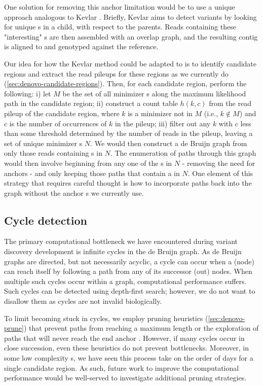 One solution for removing this anchor \kmer{} limitation would be to use a unique \kmer{} approach analogous to Kevlar \cite{Standage2019}. Briefly, Kevlar aims to detect \denovo{} variants by looking for unique \kmer{}s in a child, with respect to the parents. Reads containing these "interesting" \kmer{}s are then assembled with an overlap graph, and the resulting contig is aligned to and genotyped against the reference.

Our idea for how the Kevlar method could be adapted to \pandora{} is to identify candidate regions and extract the read pileups for these regions as we currently do (\autoref{sec:denovo-candidate-regions}). Then, for each candidate region, perform the following: i) let $M$ be the set of all minimizer \kmer{}s along the maximum likelihood path in the candidate region; ii) construct a \kmer{} count table $h(k,c)$ from the read pileup of the candidate region, where $k$ is a minimizer \kmer{} not in $M$ (i.e., $k \notin M$) and $c$ is the number of occurrences of $k$ in the pileup; iii) filter out any $k$ with $c$ less than some threshold determined by the number of reads in the pileup, leaving a set of unique minimizer \kmer{}s $N$. We would then construct a de Bruijn graph from only those reads containing \kmer{}s in $N$. The enumeration of paths through this graph would then involve beginning from any one of the \kmer{}s in $N$ - removing the need for anchors - and only keeping those paths that contain a \kmer{} in $N$. One element of this strategy that requires careful thought is how to incorporate paths back into the graph without the anchor \kmer{}s we currently use.

\subsection{Cycle detection}
\label{sec:denovo-cycles}
The primary computational bottleneck we have encountered during \denovo{} variant discovery development is infinite cycles in the de Bruijn graph. As de Bruijn graphs are directed, but not necessarily acyclic, a cycle can occur when a \kmer{} (node) can reach itself by following a path from any of its successor (out) nodes. When multiple such cycles occur within a graph, computational performance suffers. Such cycles can be detected using depth-first search; however, we do not want to disallow them as cycles are not invalid biologically. 

To limit becoming stuck in cycles, we employ pruning heuristics (\autoref{sec:denovo-prune}) that prevent paths from reaching a maximum length or the exploration of paths that will never reach the end anchor \kmer{}. However, if many cycles occur in close succession, even these heuristics do not prevent bottlenecks. Moreover, in some low complexity \prg{}s, we have seen this process take on the order of days for a single candidate region. As such, future work to improve the computational performance would be well-served to investigate additional pruning strategies. 

